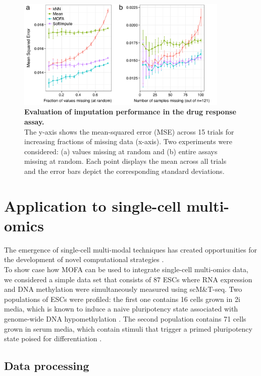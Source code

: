 \begin{figure}[H]
	\centering 	
	\includegraphics[width=0.9\textwidth]{MOFA_imputation}
	\caption{\textbf{Evaluation of imputation performance in the drug response assay.}\\
	The y-axis shows the mean-squared error (MSE) across 15 trials for increasing fractions of missing data (x-axis). Two experiments were considered: (a) values missing at random and (b) entire assays missing at random. Each point displays the mean across all trials and the error bars depict the corresponding standard deviations.}
	\label{fig:MOFA_imputation}
\end{figure}


\newpage

\section{Application to single-cell multi-omics} \label{section:mofa_scmt}

The emergence of single-cell multi-modal techniques has created opportunities for the development of novel computational strategies \cite{Stuart2019,Colome-Tatche2018,Chappell2018}.\\
To show case how MOFA can be used to integrate single-cell multi-omics data, we considered a simple data set that consists of 87 ESCs where RNA expression and DNA methylation were simultaneously measured using scM\&T-seq\cite{Angermueller2016}. Two populations of ESCs were profiled: the first one contains 16 cells grown in 2i media, which is known to induce a naive pluripotency state associated with genome-wide DNA hypomethylation \cite{Ficz2013}. The second population contains 71 cells grown in serum media, which contain stimuli that trigger a primed pluripotency state poised for differentiation \cite{Tosolini2016}.

\subsection{Data processing}

